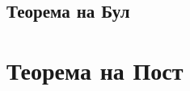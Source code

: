 \documentclass[fleqn,12pt]{article}
\begin{document}
\begin{flushleft}
\subsection{Теорема на Бул}

\section{Теорема на Пост}


\end{flushleft}
\end{document}
